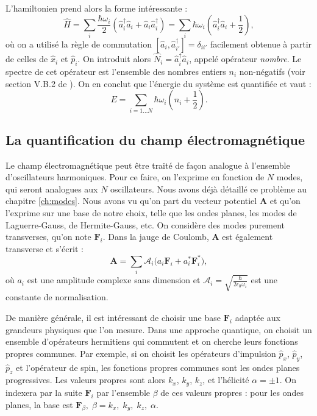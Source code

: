 L'hamiltonien prend alors la forme intéressante :
\begin{equation}
\hat{H}=\sum_i \frac{\hbar\omega_i}{2}\left(\hat{a}^{\dag}_{i}\hat{a}_{i}+\hat{a}_{i}\hat{a}^{\dag}_{i}\right)
=\sum_i \hbar\omega_i\left(\hat{a}^{\dag}_{i}\hat{a}_{i}+\frac{1}{2}\right),
\end{equation}
où on a utilisé la règle de commutation $\left[\hat{a}_{i},\hat{a}^{\dag}_{i'}\right] = \delta_{ii'}$ facilement obtenue à partir de celles de $\hat{x}_i$ et $\hat{p}_i$. On introduit alors $\hat{N}_i=\hat{a}^{\dag}_{i}\hat{a}_{i}$, appelé opérateur \textit{nombre}. Le spectre de cet opérateur est l'ensemble des nombres entiers $n_i$ non-négatifs (voir section V.B.2 de ). On en conclut que l'énergie du système est quantifiée et vaut :
\begin{equation}
E = \sum_{i=1\ldots N} \hbar \omega_i (n_i + \frac{1}{2}).
\end{equation}


\subsection{La quantification du champ électromagnétique}
\label{sec:quant_EM}
Le champ électromagnétique peut être traité de façon analogue à l'ensemble d'oscillateurs harmoniques. Pour ce faire, on l'exprime en fonction de $N$ modes, qui seront analogues aux $N$ oscillateurs. Nous avons déjà détaillé ce problème au chapitre \ref{ch:modes}. Nous avons vu qu'on part du vecteur potentiel $\bm{A}$ et qu'on l'exprime sur une base de notre choix, telle que les ondes planes, les modes de Laguerre-Gauss, de Hermite-Gauss, etc. On considère des modes purement transverses, qu'on note $\bm{F}_i$. Dans la jauge de Coulomb, $\bm{A}$ est également transverse et s'écrit :
\begin{equation}
\bm{A}=\sum_{i}{\mathcal{A}_i (a_{i}\bm{F}_i+a^*_{i}\bm{F}^*_i}),
\label{A_decomp_Flambda}
\end{equation}
où $a_{i}$ est une amplitude complexe sans dimension et $\mathcal{A}_i=\sqrt{\frac{\hbar}{2\epsilon_0\omega_i}}$ est une constante de normalisation. 

De manière générale, il est intéressant de choisir une base $\bm{F}_i$ adaptée aux grandeurs physiques que l'on mesure. Dans une approche quantique, on choisit un ensemble d'opérateurs hermitiens qui commutent et on cherche leurs fonctions propres communes. Par exemple, si on choisit les opérateurs d'impulsion $\hat{p}_x$, $\hat{p}_y$, $\hat{p}_z$ et l'opérateur de spin, les fonctions propres communes sont les ondes planes progressives. Les valeurs propres sont alors $k_x$, $k_y$, $k_z$, et l'hélicité $\alpha = \pm 1$. On indexera par la suite $\bm{F}_i$ par l'ensemble $\beta$ de ces valeurs propres : pour les ondes planes, la base est $\bm{F}_{\beta},\;\beta=k_x,\;k_y,\;k_z,\;\alpha$.

